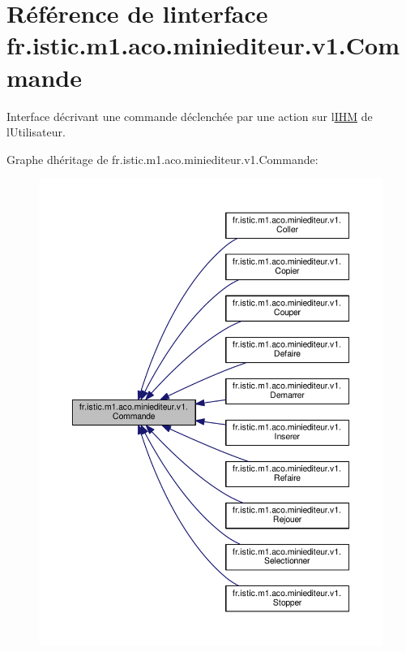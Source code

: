 \hypertarget{interfacefr_1_1istic_1_1m1_1_1aco_1_1miniediteur_1_1v1_1_1Commande}{}\section{Référence de l\textquotesingle{}interface fr.\+istic.\+m1.\+aco.\+miniediteur.\+v1.\+Commande}
\label{interfacefr_1_1istic_1_1m1_1_1aco_1_1miniediteur_1_1v1_1_1Commande}


Interface décrivant une commande déclenchée par une action sur l\textquotesingle{}\hyperlink{interfacefr_1_1istic_1_1m1_1_1aco_1_1miniediteur_1_1v1_1_1IHM}{I\+HM} de l\textquotesingle{}Utilisateur.  




Graphe d\textquotesingle{}héritage de fr.\+istic.\+m1.\+aco.\+miniediteur.\+v1.\+Commande\+:
\nopagebreak
\begin{figure}[H]
\begin{center}
\leavevmode
\includegraphics[width=350pt]{interfacefr_1_1istic_1_1m1_1_1aco_1_1miniediteur_1_1v1_1_1Commande__inherit__graph}
\end{center}
\end{figure}
